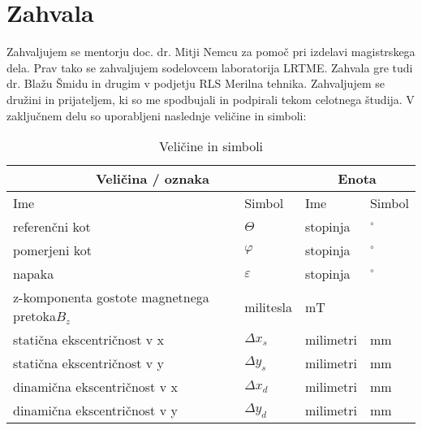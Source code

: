 \documentclass[a4paper,twoside,openright,12pt]{book}
\date{Ljubljana, 2018}
\begin{document}
\frontmatter
%
%
\maketitle
%
%
\chapter*{Zahvala}
Zahvaljujem se mentorju doc. dr. Mitji Nemcu za pomoč pri izdelavi magistrskega dela. Prav tako se zahvaljujem sodelovcem laboratorija LRTME.
Zahvala gre tudi dr. Blažu Šmidu in drugim v podjetju RLS Merilna tehnika.
Zahvaljujem se družini in prijateljem, ki so me spodbujali in podpirali tekom celotnega študija.
%
%
\tableofcontents
%
%
%
\seznamsimbolov
V zaključnem delu so uporabljeni naslednje veličine in
simboli:
%
\begin{table}[h]
\centering
\begin{tabular}{l l l l}
 \hline \multicolumn{2}{c}{\bf{Veličina / oznaka}} & \multicolumn{2}{c}{\bf{Enota}}  \\
 \hline
Ime & Simbol & Ime & Simbol \\
 \hline
 referenčni kot & $\Theta$  & stopinja & $^\circ$ \\
 pomerjeni kot & $\varphi$  & stopinja & $^\circ$ \\
 napaka& $\varepsilon$& stopinja & $^\circ$ \\
 z-komponenta gostote magnetnega pretoka$B_z$& militesla & mT \\
 statična ekscentričnost v x&$\Delta x_s$& milimetri & mm \\
 statična ekscentričnost v y&$\Delta y_s$& milimetri & mm \\
 dinamična ekscentričnost v x&$\Delta x_d$& milimetri & mm \\
 dinamična ekscentričnost v y&$\Delta y_d$& milimetri & mm \\
  \hline
\end{tabular}
  \caption{Veličine in simboli}
  \label{prebojne_trdnosti}
\end{table}
%
%
%
%
\mainmatter
%
%
\povzetek
\end{document}
